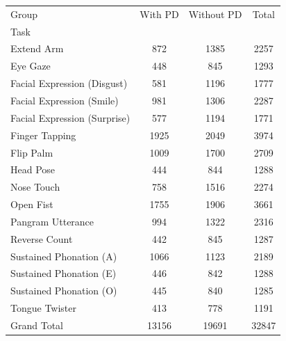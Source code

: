 \begin{table}
\label{tab:task_dist}
\begin{tabular}{lccc}
\toprule
Group & With PD & Without PD & Total \\
Task &  &  &  \\
\midrule
Extend Arm & 872 & 1385 & 2257 \\
Eye Gaze & 448 & 845 & 1293 \\
Facial Expression (Disgust) & 581 & 1196 & 1777 \\
Facial Expression (Smile) & 981 & 1306 & 2287 \\
Facial Expression (Surprise) & 577 & 1194 & 1771 \\
Finger Tapping & 1925 & 2049 & 3974 \\
Flip Palm & 1009 & 1700 & 2709 \\
Head Pose & 444 & 844 & 1288 \\
Nose Touch & 758 & 1516 & 2274 \\
Open Fist & 1755 & 1906 & 3661 \\
Pangram Utterance & 994 & 1322 & 2316 \\
Reverse Count & 442 & 845 & 1287 \\
Sustained Phonation (A) & 1066 & 1123 & 2189 \\
Sustained Phonation (E) & 446 & 842 & 1288 \\
Sustained Phonation (O) & 445 & 840 & 1285 \\
Tongue Twister & 413 & 778 & 1191 \\
Grand Total & 13156 & 19691 & 32847 \\
\bottomrule
\end{tabular}
\end{table}
